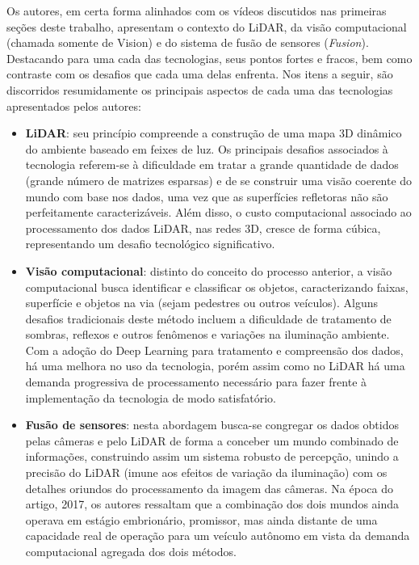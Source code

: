 Os autores, em certa forma alinhados com os vídeos discutidos nas primeiras seções deste trabalho, apresentam o contexto do LiDAR, da visão computacional (chamada somente de Vision) e do sistema de fusão de sensores (\textit{Fusion}). Destacando para uma cada das tecnologias, seus pontos fortes e fracos, bem como contraste com os desafios que cada uma delas enfrenta. Nos itens a seguir, são discorridos resumidamente os principais aspectos de cada uma das tecnologias apresentados pelos autores:

\begin{itemize}
    \item \textbf{LiDAR}: seu princípio compreende a construção de uma mapa 3D dinâmico do ambiente baseado em feixes de luz. Os principais desafios associados à tecnologia referem-se à dificuldade em tratar a grande quantidade de dados (grande número de matrizes esparsas) e de se construir uma visão coerente do mundo com base nos dados, uma vez que as superfícies refletoras não são perfeitamente caracterizáveis. Além disso, o custo computacional associado ao processamento dos dados LiDAR, nas redes 3D, cresce de forma cúbica, representando um desafio tecnológico significativo.
    \item \textbf{Visão computacional}: distinto do conceito do processo anterior, a visão computacional busca identificar e classificar os objetos, caracterizando faixas, superfície e objetos na via (sejam pedestres ou outros veículos). Alguns desafios tradicionais deste método incluem a dificuldade de tratamento de sombras, reflexos e outros fenômenos e variações na iluminação ambiente. Com a adoção do Deep Learning para tratamento e compreensão dos dados, há uma melhora no uso da tecnologia, porém assim como no LiDAR há uma demanda progressiva de processamento necessário para fazer frente à implementação da tecnologia de modo satisfatório.
    \item \textbf{Fusão de sensores}: nesta abordagem busca-se congregar os dados obtidos pelas câmeras e pelo LiDAR de forma a conceber um mundo combinado de informações, construindo assim um sistema robusto de percepção, unindo a precisão do LiDAR (imune aos efeitos de variação da iluminação) com os detalhes oriundos do processamento da imagem das câmeras. Na época do artigo, 2017, os autores ressaltam que a combinação dos dois mundos ainda operava em estágio embrionário, promissor, mas ainda distante de uma capacidade real de operação para um veículo autônomo em vista da demanda computacional agregada dos dois métodos.
\end{itemize}


